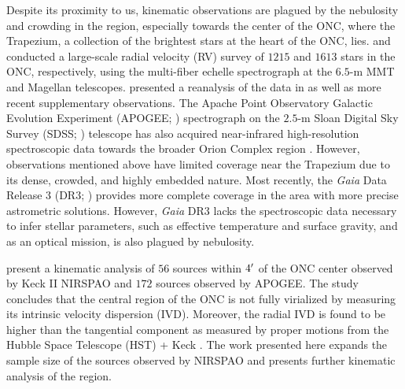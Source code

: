 \documentclass[12pt]{ucsddissertation}
\begin{document}
\begin{CJK*}{UTF8}{gbsn}
Despite its proximity to us, kinematic observations are plagued by the nebulosity and crowding in the region, especially towards the center of the ONC, where the Trapezium, a collection of the brightest stars at the heart of the ONC, lies. \citet{Furesz-2008} and \citet{Tobin-2009} conducted a large-scale radial velocity (RV) survey of $1215$ and $1613$ stars in the ONC, respectively, using the multi-fiber echelle spectrograph at the $6.5$-m MMT and Magellan telescopes. \citet{Kounkel-2016} presented a reanalysis of the data in \citet{Tobin-2009} as well as more recent supplementary observations. The Apache Point Observatory Galactic Evolution Experiment (APOGEE; \citealt{Majewski-2017}) spectrograph on the $2.5$-m Sloan Digital Sky Survey (SDSS; \citealt{York-2000}) telescope has also acquired near-infrared high-resolution spectroscopic data towards the broader Orion Complex region \citep[][]{DaRio-2016, DaRio-2017, Kounkel-2018}. However, observations mentioned above have limited coverage near the Trapezium due to its dense, crowded, and highly embedded nature. Most recently, the \textit{Gaia} Data Release 3 (DR3; \citealt{Gaia-2016, GaiaDR3-2023j}) provides more complete coverage in the area with more precise astrometric solutions. However, \textit{Gaia} DR3 lacks the spectroscopic data necessary to infer stellar parameters, such as effective temperature and surface gravity, and as an optical mission, is also plagued by nebulosity. 

\citet[hereafter T22]{Theissen-2022} present a kinematic analysis of $56$ sources within $4\mbox{$^\prime$}$ of the ONC center observed by Keck II NIRSPAO and $172$ sources observed by APOGEE. The study concludes that the central region of the ONC is not fully virialized by measuring its intrinsic velocity dispersion (IVD). Moreover, the radial IVD is found to be higher than the tangential component as measured by proper motions from the Hubble Space Telescope (HST) + Keck \citep[][hereafter K19]{Kim-2019}. The work presented here expands the sample size of the sources observed by NIRSPAO and presents further kinematic analysis of the region.



\end{CJK*}
\end{document}
